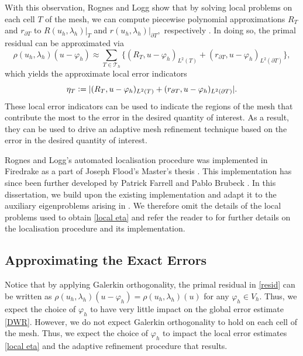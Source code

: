 With this observation, Rognes and Logg show that by solving local problems on each cell $T$ of the mesh, we can compute piecewise polynomial approximations $R_T$ and $r_{\partial T}$ to $R(u_h, \lambda_h) |_T$ and $r(u_h, \lambda_h)|_{\partial T},$ respectively \cite{logg}. In doing so, the primal residual can be approximated via
\begin{equation}
    \rho(u_h, \lambda_h)(u - \varphi_h)  \approx  \sum_{T \in \mathcal{T}_h} \{ (R_T, u - \varphi_h)_{L^2(T)} + (r_{\partial T}, u-\varphi_h)_{L^2(\partial T)}\},
\end{equation}
which yields the approximate local error indicators
\begin{equation} \label{local eta}
    \eta_T \vcentcolon= |  (R_T, u - \varphi_h)_{L^2(T)} + (r_{\partial T}, u-\varphi_h)_{L^2(\partial T)} |.
\end{equation}
These local error indicators can be used to indicate the regions of the mesh that contribute the most to the error in the desired quantity of interest. As a result, they can be used to drive an adaptive mesh refinement technique based on the error in the desired quantity of interest. 

Rognes and Logg's automated localisation procedure was implemented in Firedrake as a part of Joseph Flood's Master's thesis \cite{joe}. This implementation has since been further developed by Patrick Farrell and Pablo Brubeck \cite{pablo}. In this dissertation, we build upon the existing implementation and adapt it to the auxiliary eigenproblems arising in . We therefore omit the details of the local problems used to obtain \eqref{local eta} and refer the reader to \cite{joe, logg, pablo} for further details on the localisation procedure and its implementation.


\subsection{Approximating the Exact Errors}



Notice that by applying Galerkin orthogonality, the primal residual in \eqref{resid} can be written as $\rho(u_h, \lambda_h)(u-\varphi_h) = \rho(u_h, \lambda_h)(u)$ for any $\varphi_h \in V_h.$ Thus, we expect the choice of $\varphi_h$ to have very little impact on the global error estimate \eqref{DWR}. However, we do not expect Galerkin orthogonality to hold on each cell of the mesh. Thus, we expect the choice of $\varphi_h$ to impact the local error estimates \eqref{local eta} and the adaptive refinement procedure that results.

